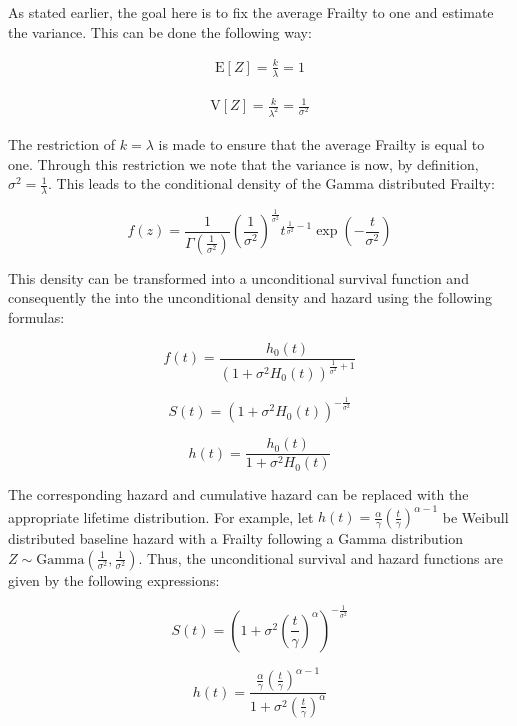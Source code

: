 As stated earlier, the goal here is to fix the average Frailty to one and estimate the variance. This can be done the following way:

\begin{align*}
\mathrm{E}[Z] = \frac{k}{\lambda} = 1 \tag{$ k = \lambda $}
\end{align*}


\begin{align*}
\mathrm{V}[Z] = \frac{k}{\lambda^2} = \frac{1}{\sigma^2} \tag{$ k = \lambda $}
\end{align*}


The restriction of $k = \lambda$ is made to ensure that the average Frailty is equal to one. Through this restriction we note that the variance is now, by definition, $\sigma^2 = \frac{1}{\lambda}$. This leads to the conditional density of the Gamma distributed Frailty:

$$ f(z) = \frac{1}{\Gamma(\frac{1}{\sigma^2})} \left (\frac{1}{\sigma^2}  \right )^{\frac{1}{\sigma^2}} t^{\frac{1}{\sigma^2} - 1} \exp(-\frac{t}{\sigma^2}) $$

This density can be transformed into a unconditional survival function and consequently the into the unconditional density and hazard using the following formulas:

$$ f(t) = \frac{h_0(t)}{(1+ \sigma^2 H_0(t))^{\frac{1}{\sigma^2}+ 1 } }$$

$$ S(t) = (1 + \sigma^2 H_0(t))^{- \frac{1}{\sigma^2}}$$

$$ h(t) = \frac{h_0(t)}{1 + \sigma^2 H_0(t)} $$



The corresponding hazard and cumulative hazard can be replaced with the appropriate lifetime distribution. For example, let $h(t) =  \frac{\alpha}{\gamma} \left (\frac{t}{\gamma}  \right )^{\alpha - 1}$ be Weibull distributed baseline hazard with a Frailty following a Gamma distribution $Z \sim \text{Gamma}(\frac{1}{\sigma^2}, \frac{1}{\sigma^2} )$. Thus, the unconditional survival and hazard functions are given by the following expressions:

$$ S(t) = \left (1 + \sigma^2 \left (\frac{t}{\gamma}  \right )^{\alpha}  \right )^{-\frac{1}{\sigma^2}} $$

$$ h(t) = \frac{\frac{\alpha}{\gamma}\left (\frac{t}{\gamma}  \right )^{\alpha - 1}}{1 + \sigma^2 \left (\frac{t}{\gamma}  \right )^{\alpha} } $$

